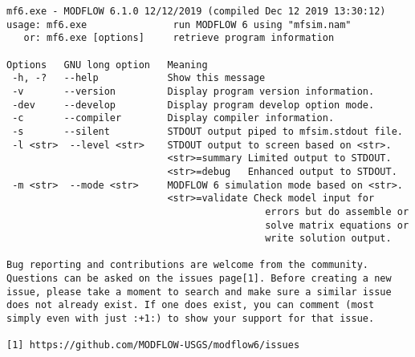 {\small
\begin{lstlisting}[style=modeloutput]
mf6.exe - MODFLOW 6.1.0 12/12/2019 (compiled Dec 12 2019 13:30:12)
usage: mf6.exe               run MODFLOW 6 using "mfsim.nam"
   or: mf6.exe [options]     retrieve program information

Options   GNU long option   Meaning
 -h, -?   --help            Show this message
 -v       --version         Display program version information.
 -dev     --develop         Display program develop option mode.
 -c       --compiler        Display compiler information.
 -s       --silent          STDOUT output piped to mfsim.stdout file.
 -l <str>  --level <str>    STDOUT output to screen based on <str>.
                            <str>=summary Limited output to STDOUT.
                            <str>=debug   Enhanced output to STDOUT.
 -m <str>  --mode <str>     MODFLOW 6 simulation mode based on <str>.
                            <str>=validate Check model input for
                                             errors but do assemble or
                                             solve matrix equations or
                                             write solution output.

Bug reporting and contributions are welcome from the community.
Questions can be asked on the issues page[1]. Before creating a new
issue, please take a moment to search and make sure a similar issue
does not already exist. If one does exist, you can comment (most
simply even with just :+1:) to show your support for that issue.

[1] https://github.com/MODFLOW-USGS/modflow6/issues


\end{lstlisting}
}
